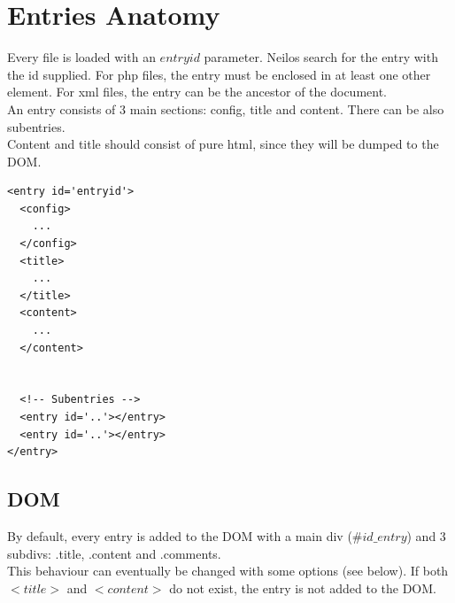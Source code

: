 \documentclass[a4paper,12pt]{article}
\begin{document}
\section{Entries Anatomy}
Every file is loaded with an $entryid$ parameter. Neilos search for the entry with the id supplied. For php files, the entry must be enclosed in at least one other element. For xml files, the entry can be the ancestor of the document.\\
An entry consists of 3 main sections: config, title and content. There can be also subentries.\\
Content and title should consist of pure html, since they will be dumped to the DOM.\\
\footnotesize
\begin{verbatim}
<entry id='entryid'>
  <config>
    ...
  </config>
  <title>
    ...
  </title>
  <content>
    ...
  </content>


  <!-- Subentries -->
  <entry id='..'></entry>
  <entry id='..'></entry>
</entry>
\end{verbatim}
\normalsize
\subsection{DOM}
By default, every entry is added to the DOM with a main div ($\#id\_entry$) and 3 subdivs: .title, .content and .comments.\\
This behaviour can eventually be changed with some options (see below). If both $<title>$ and $<content>$ do not exist, the entry is not added to the DOM.
\end{document}
